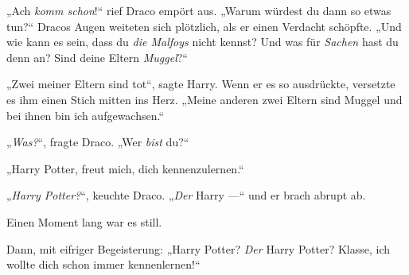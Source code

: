 „Ach \emph{komm schon}!“ rief Draco empört aus.
„Warum würdest du dann so etwas tun?“ Dracos Augen weiteten sich plötzlich, als er einen Verdacht schöpfte.
„Und wie kann es sein, dass du \emph{die Malfoys} nicht kennst? Und was für \emph{Sachen} hast du denn an? Sind deine Eltern \emph{Muggel}?“

„Zwei meiner Eltern sind tot“, sagte Harry. Wenn er es so ausdrückte, versetzte es ihm einen Stich mitten ins Herz.
„Meine anderen zwei Eltern sind Muggel und bei ihnen bin ich aufgewachsen.“

„\emph{Was?}“, fragte Draco.
„Wer \emph{bist} du?“

„Harry Potter, freut mich, dich kennenzulernen.“

„\emph{Harry Potter?}“, keuchte Draco.
„\emph{Der} Harry —“ und er brach abrupt ab.

Einen Moment lang war es still.

Dann, mit eifriger Begeisterung:
„Harry Potter? \emph{Der} Harry Potter? Klasse, ich wollte dich schon immer kennenlernen!“

